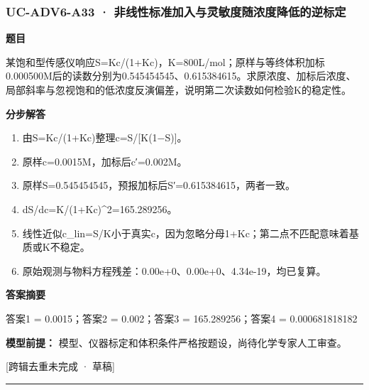 \documentclass[UTF8,11pt,a4paper]{ctexart}
\begin{document}
\subsubsection*{UC-ADV6-A33 · 非线性标准加入与灵敏度随浓度降低的逆标定}
\noindent\textbf{题目}\par
某饱和型传感仪响应S=Kc/(1+Kc)，K=800L/mol；原样与等终体积加标0.000500M后的读数分别为0.545454545、0.615384615。求原浓度、加标后浓度、局部斜率与忽视饱和的低浓度反演偏差，说明第二次读数如何检验K的稳定性。\par
\medskip\noindent\textbf{分步解答}
\begin{enumerate}
\item 由S=Kc/(1+Kc)整理c=S/[K(1−S)]。
\item 原样c=0.0015M，加标后c′=0.002M。
\item 原样S=0.545454545，预报加标后S′=0.615384615，两者一致。
\item dS/dc=K/(1+Kc)\textasciicircum{}2=165.289256。
\item 线性近似c\_lin=S/K小于真实c，因为忽略分母1+Kc；第二点不匹配意味着基质或K不稳定。
\item 原始观测与物料方程残差：0.00e+0、0.00e+0、4.34e-19，均已复算。
\end{enumerate}
\noindent\textbf{答案摘要}\par
答案1 = 0.0015；答案2 = 0.002；答案3 = 165.289256；答案4 = 0.000681818182\par
\noindent\textbf{模型前提：}
模型、仪器标定和体积条件严格按题设，尚待化学专家人工审查。\par
\noindent\textcolor{red!65!black}{[跨辑去重未完成 · 草稿]} \par
\medskip\hrule\medskip
{}
\end{document}
